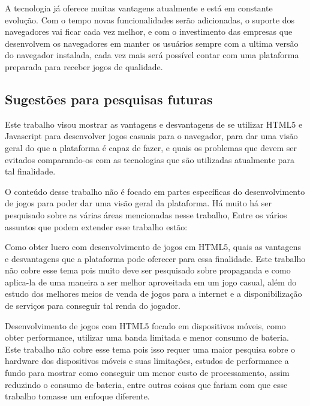 A tecnologia já oferece muitas vantagens atualmente e está em
constante evolução. Com o tempo novas funcionalidades serão
adicionadas, o suporte dos navegadores vai ficar cada vez melhor, e
com o investimento das empresas que desenvolvem os navegadores em manter
os usuários sempre com a ultima versão do navegador instalada, cada vez
mais será possível contar com uma plataforma preparada para receber
jogos de qualidade.

\subsection{Sugestões para pesquisas futuras}

Este trabalho visou mostrar as vantagens e desvantagens de se utilizar
HTML5 e Javascript para desenvolver jogos casuais para o navegador,
para dar uma visão geral do que a plataforma é capaz de fazer, e quais
os problemas que devem ser evitados comparando-os com as tecnologias
que são utilizadas atualmente para tal finalidade.

O conteúdo desse trabalho não é focado em partes específicas do
desenvolvimento de jogos para poder dar uma visão geral da plataforma.
Há muito há ser pesquisado sobre as várias áreas mencionadas nesse
trabalho, Entre os vários assuntos que podem extender esse trabalho
estão:

Como obter lucro com desenvolvimento de jogos em HTML5, quais as vantagens
e desvantagens que a plataforma pode oferecer para essa
finalidade. Este trabalho não cobre esse tema pois muito deve ser
pesquisado sobre propaganda e como aplica-la de uma maneira a ser
melhor aproveitada em um jogo casual, além do estudo dos melhores
meios de venda de jogos para a internet e a disponibilização de
serviços para conseguir tal renda do jogador.

Desenvolvimento de jogos com HTML5 focado em dispositivos móveis, como
obter performance, utilizar uma banda limitada e menor consumo de
bateria. Este trabalho não cobre esse tema pois isso requer uma maior
pesquisa sobre o hardware dos dispositivos móveis e suas limitações,
estudos de performance a fundo para mostrar como conseguir um menor
custo de processamento, assim reduzindo o consumo de bateria, entre
outras coisas que fariam com que esse trabalho tomasse um enfoque
diferente.
